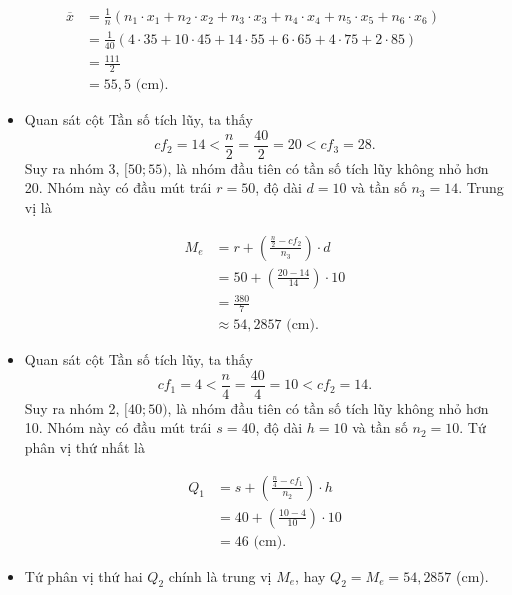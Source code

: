 \documentclass[
  letterpaper,
  DIV=11,
  numbers=noendperiod]{scrartcl}
\begin{document}
\begin{align*}
    \overline{x}
        & = \frac{1}{n}(n_1\cdot x_1 + n_2\cdot x_2 + n_3\cdot x_3 + n_4\cdot x_4 + n_5\cdot x_5 + n_6\cdot x_6) \\
        & = \frac{1}{40} (4\cdot 35 + 10\cdot 45 + 14\cdot 55 + 6\cdot 65 + 4\cdot 75 + 2\cdot 85) \\
        & = \frac{111}{2} \\
        & = 55,5 \text{ (cm).}
\end{align*}

\begin{itemize}
\item
  Quan sát cột Tần số tích lũy, ta thấy \[
  cf_2=14 <\frac{n}{2}=\frac{40}{2}=20 <cf_3=28.
  \] Suy ra nhóm 3, \([50;55)\), là nhóm đầu tiên có tần số tích lũy
  không nhỏ hơn 20. Nhóm này có đầu mút trái \(r=50\), độ dài \(d=10\)
  và tần số \(n_3=14\). Trung vị là

  \begin{align*}
        M_e
            & = r + \left(\frac{\frac{n}{2}-cf_2}{n_3}\right)\cdot d \\
            & = 50 + \left(\frac{20-14}{14}\right)\cdot 10 \\
            & = \frac{380}{7} \\
            & \approx 54,2857 \text{ (cm).}
    \end{align*}
\end{itemize}

\begin{itemize}
\item
  Quan sát cột Tần số tích lũy, ta thấy \[
  cf_1=4 < \frac{n}{4}=\frac{40}{4}=10 < cf_2=14.
  \] Suy ra nhóm 2, \([40;50)\), là nhóm đầu tiên có tần số tích lũy
  không nhỏ hơn 10. Nhóm này có đầu mút trái \(s=40\), độ dài \(h=10\)
  và tần số \(n_2=10\). Tứ phân vị thứ nhất là

  \begin{align*}
        Q_1
            & = s + \left( \frac{\frac{n}{4}-cf_1}{n_2}\right)\cdot h \\
            & = 40 + \left(\frac{10-4}{10}\right)\cdot 10 \\
            & = 46 \text{ (cm).}
    \end{align*}
\item
  Tứ phân vị thứ hai \(Q_2\) chính là trung vị \(M_e\), hay
  \(Q_2 = M_e = 54,2857\) (cm).
\end{itemize}
\end{document}
